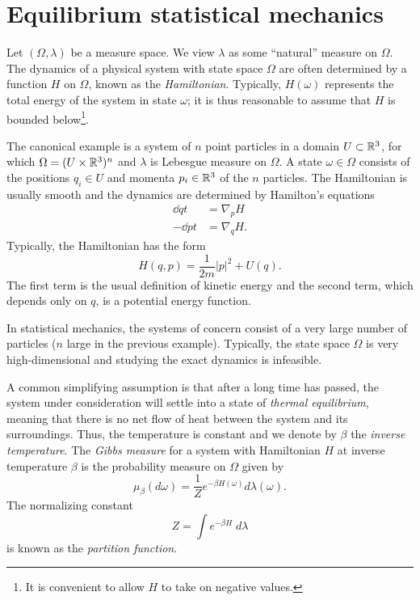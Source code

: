 
\section{Equilibrium statistical mechanics}
\label{sec:gibbs}

Let $(\Omega, \lambda)$ be a measure space. We view $\lambda$ as some ``natural''
measure on $\Omega$. The dynamics of a physical system with state space $\Omega$
are often determined by a function $H$ on $\Omega$, known as the \emph{Hamiltonian}.
Typically, $H(\omega)$ represents the total energy of the system in state $\omega$;
it is thus reasonable to assume that $H$ is bounded below\footnote{It is convenient
to allow $H$ to take on negative values.}.

\begin{example}
\label{ex:hamilton}
The canonical example is a system of $n$ point particles in a domain $U \subset {\mathbb R}^3$,
for which $\Omega = (U \times {\mathbb R}^3)^n$ and $\lambda$ is Lebesgue measure on $\Omega$.
A state $\omega\in\Omega$ consists of the positions $q_i \in U$ and momenta $p_i \in {\mathbb R}^3$
of the $n$ particles. The Hamiltonian is usually smooth and the dynamics are determined
by Hamilton's equations
\begin{align}
\dd{q}{t} 	&= \nabla_p H \\
-\dd{p}{t} 	&= \nabla_q H.
\end{align}
Typically, the Hamiltonian has the form
\begin{equation}
\label{e:total-energy}
H(q, p) = \frac{1}{2m} |p|^2 + U(q).
\end{equation}
The first term is the usual definition of kinetic energy and the second term, which
depends only on $q$, is a potential energy function.
\end{example}

In statistical mechanics, the systems of concern consist of a very large number
of particles ($n$ large in the previous example). Typically, the state space $\Omega$ is very
high-dimensional and studying the exact dynamics is infeasible.

A common simplifying assumption is that after a long time has passed, the system
under consideration will settle into a state of \emph{thermal equilibrium}, meaning
that there is no net flow of heat between the system and its surroundings. Thus,
the temperature is constant and we denote by $\beta$ the \emph{inverse temperature}.
The \emph{Gibbs measure} \cite{Gibbs60} for a system with Hamiltonian $H$ at inverse temperature
$\beta$ is the probability measure on $\Omega$ given by
\begin{equation}
\label{e:gibbs-def}
\mu_\beta(d\omega) = \frac{1}{Z} e^{-\beta H(\omega)} d\lambda(\omega).
\end{equation}
The normalizing constant
\begin{equation}
Z = \int e^{-\beta H} \; d\lambda
\end{equation}
is known as the \emph{partition function}.

